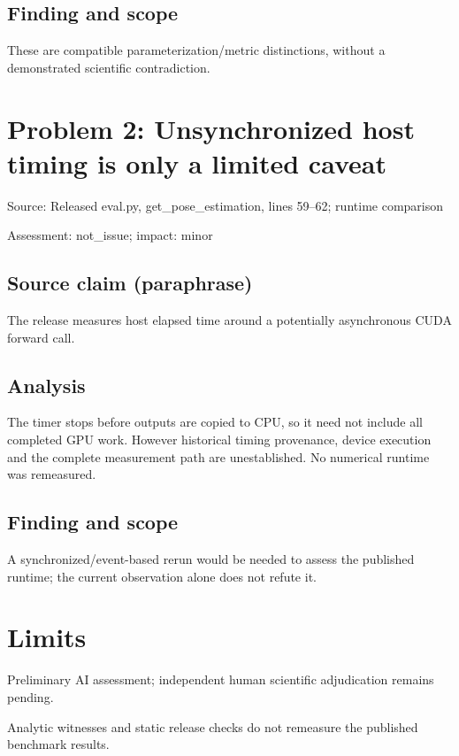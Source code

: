 \documentclass[11pt]{article}
\begin{document}
\subsection*{Finding and scope}

These are compatible parameterization/metric distinctions, without a demonstrated scientific contradiction.

\section*{Problem 2: Unsynchronized host timing is only a limited caveat}

Source: Released eval.py, get\_pose\_estimation, lines 59–62; runtime comparison

Assessment: not\_issue; impact: minor

\subsection*{Source claim (paraphrase)}

The release measures host elapsed time around a potentially asynchronous CUDA forward call.

\subsection*{Analysis}

The timer stops before outputs are copied to CPU, so it need not include all completed GPU work. However historical timing provenance, device execution and the complete measurement path are unestablished. No numerical runtime was remeasured.

\subsection*{Finding and scope}

A synchronized/event-based rerun would be needed to assess the published runtime; the current observation alone does not refute it.

\section*{Limits}

Preliminary AI assessment; independent human scientific adjudication remains pending.\par

Analytic witnesses and static release checks do not remeasure the published benchmark results.\par
\end{document}
